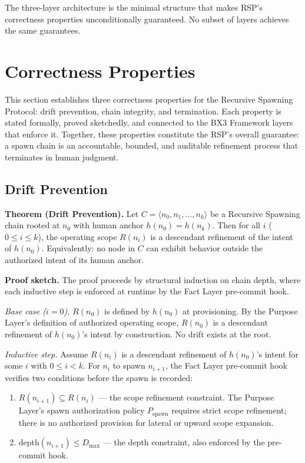 The three-layer architecture is the minimal structure that makes RSP's correctness properties unconditionally guaranteed. No subset of layers achieves the same guarantees.

\section{Correctness Properties}
\label{sec:rs-correctness}

This section establishes three correctness properties for the Recursive Spawning Protocol: drift prevention, chain integrity, and termination. Each property is stated formally, proved sketchedly, and connected to the BX3 Framework layers that enforce it. Together, these properties constitute the RSP's overall guarantee: a spawn chain is an accountable, bounded, and auditable refinement process that terminates in human judgment.

\subsection{Drift Prevention}
\label{sec:rs-drift-prevention-proof}

\medskip
\noindent\textbf{Theorem (Drift Prevention).} Let $C = \langle n_0, n_1, \ldots, n_k \rangle$ be a Recursive Spawning chain rooted at $n_0$ with human anchor $h(n_0) = h(n_k)$. Then for all $i$ ($0 \leq i \leq k$), the operating scope $R(n_i)$ is a descendant refinement of the intent of $h(n_0)$. Equivalently: no node in $C$ can exhibit behavior outside the authorized intent of its human anchor.

\medskip
\noindent\textbf{Proof sketch.} The proof proceeds by structural induction on chain depth, where each inductive step is enforced at runtime by the Fact Layer pre-commit hook.

\medskip
\textit{Base case ($i=0$).} $R(n_0)$ is defined by $h(n_0)$ at provisioning. By the Purpose Layer's definition of authorized operating scope, $R(n_0)$ is a descendant refinement of $h(n_0)$'s intent by construction. No drift exists at the root.

\medskip
\textit{Inductive step.} Assume $R(n_i)$ is a descendant refinement of $h(n_0)$'s intent for some $i$ with $0 \leq i < k$. For $n_i$ to spawn $n_{i+1}$, the Fact Layer pre-commit hook verifies two conditions before the spawn is recorded:

\begin{enumerate}
    \item[(a)] $R(n_{i+1}) \subseteq R(n_i)$ — the scope refinement constraint. The Purpose Layer's spawn authorization policy $P_{\mathrm{spawn}}$ requires strict scope refinement; there is no authorized provision for lateral or upward scope expansion.
    \item[(b)] $\mathrm{depth}(n_{i+1}) \leq D_{\mathrm{max}}$ — the depth constraint, also enforced by the pre-commit hook.
\end{enumerate}

